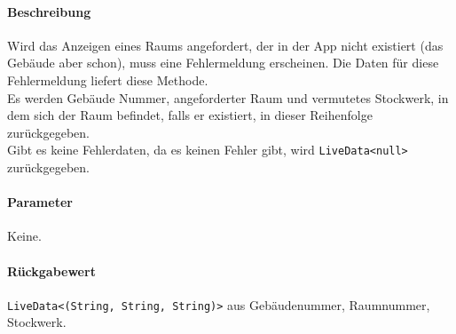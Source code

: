 \paragraph*{Beschreibung}
Wird das Anzeigen eines Raums angefordert, der in der App nicht existiert (das Gebäude aber schon), 
muss eine Fehlermeldung erscheinen. Die Daten für diese Fehlermeldung liefert diese Methode.\\
Es werden Gebäude Nummer, angeforderter Raum und vermutetes Stockwerk, in dem sich der Raum befindet, 
falls er existiert, in dieser Reihenfolge zurückgegeben.\\
Gibt es keine Fehlerdaten, da es keinen Fehler gibt, wird \texttt{LiveData<null>} zurückgegeben.
\paragraph*{Parameter}
Keine.
\paragraph*{Rückgabewert}
\texttt{LiveData<(String, String, String)>} aus Gebäudenummer, Raumnummer, Stockwerk.

